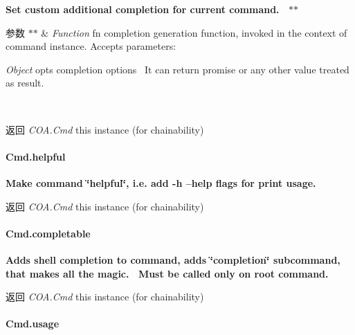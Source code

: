 {\bfseries {\bfseries {\bfseries  Set custom additional completion for current command.~\newline
 $\ast$$\ast$
\begin{DoxyParams}{参数}
{\em $\ast$$\ast$} & {\itshape Function} {\ttfamily fn} completion generation function, invoked in the context of command instance. Accepts parameters\+:~\newline

\begin{DoxyItemize}
\item {\itshape Object} {\ttfamily opts} completion options~\newline
 It can return promise or any other value treated as result.~\newline
 {\bfseries }
\end{DoxyItemize}\\
\hline
\end{DoxyParams}
\begin{DoxyReturn}{返回}
{\bfseries } {\itshape C\+O\+A.\+Cmd} {\ttfamily this} instance (for chainability)
\end{DoxyReturn}
\paragraph*{Cmd.\+helpful}}}}

{\bfseries {\bfseries {\bfseries  Make command \char`\"{}helpful\char`\"{}, i.\+e. add -\/h --help flags for print usage.~\newline
 {\bfseries \begin{DoxyReturn}{返回}
{\itshape C\+O\+A.\+Cmd} {\ttfamily this} instance (for chainability)
\end{DoxyReturn}
\paragraph*{Cmd.\+completable}}}}}

{\bfseries {\bfseries {\bfseries {\bfseries  Adds shell completion to command, adds \char`\"{}completion\char`\"{} subcommand, that makes all the magic.~\newline
 Must be called only on root command.~\newline
 {\bfseries \begin{DoxyReturn}{返回}
{\itshape C\+O\+A.\+Cmd} {\ttfamily this} instance (for chainability)
\end{DoxyReturn}
\paragraph*{Cmd.\+usage}}}}}}

